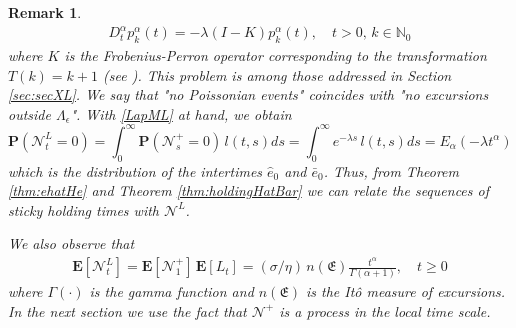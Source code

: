 \documentclass[11pt,a4paper]{article}
\newtheorem{remark}{Remark}[section]
\begin{document}
\begin{remark}
{\begin{align*}
D^\alpha_t p^\alpha_k(t) = - \lambda (I-K)p^\alpha_k(t), \quad t >0,\, k \in \mathbb{N}_0 
\end{align*}
where $K$ is the Frobenius-Perron operator corresponding to the transformation $T(k) = k + 1$ (see \cite[Remark 17]{dovWright}). This problem is among those addressed in Section \ref{sec:secXL}. 
We say that "no Poissonian events" coincides with "no excursions outside $\Lambda_\epsilon$". With \eqref{LapML} at hand, we obtain
\begin{equation*}
\mathbf{P}(\mathcal{N}^L_t = 0) = \int_0^\infty \mathbf{P}(\mathcal{N}^+_s = 0)\, l(t,s)ds = \int_0^\infty e^{- \lambda s}\, l(t,s)ds = E_\alpha(-\lambda t^\alpha)
\end{equation*}
which is the distribution of the intertimes $\hat{e}_0$ and $\bar{e}_0$. Thus, from Theorem \ref{thm:ehatHe} and Theorem \ref{thm:holdingHatBar} we can relate the sequences of sticky holding times with $\mathcal{N}^L$. 

We also observe that
\begin{align*}
\mathbf{E}[\mathcal{N}^L_t] = \mathbf{E}[\mathcal{N}^+_1]\, \mathbf{E}[L_t] = (\sigma/\eta)\, n(\mathfrak{E}) \frac{t^\alpha}{\Gamma(\alpha + 1)}, \quad t \geq 0
\end{align*}
where $\Gamma(\cdot)$ is the gamma function and $n(\mathfrak{E})$ is the It\^{o} measure of excursions. In the next section we use the fact that $\mathcal{N}^+$ is a process in the local time scale.
}
\end{remark}
\end{document}
